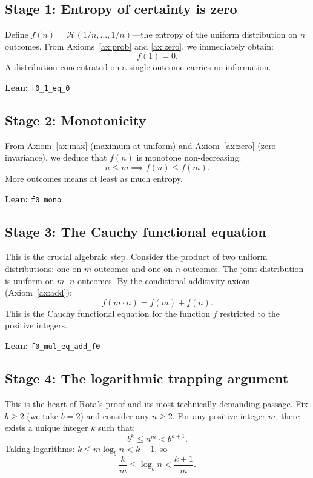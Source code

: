 \documentclass[12pt,a4paper]{article}
\theoremstyle{definition}
\newcommand{\lean}[1]{\texttt{#1}}
\newcommand{\Hfunc}{\mathcal{H}}
\begin{document}
\subsection{Stage 1: Entropy of certainty is zero}

Define $f(n) = \Hfunc(1/n, \dots, 1/n)$---the entropy of the uniform
distribution on $n$ outcomes.  From Axioms~\ref{ax:prob} and
\ref{ax:zero}, we immediately obtain:
\[
  f(1) = 0.
\]
A distribution concentrated on a single outcome carries no information.

\medskip\noindent
\textbf{Lean:} \lean{f0\_1\_eq\_0}

\subsection{Stage 2: Monotonicity}

From Axiom~\ref{ax:max} (maximum at uniform) and Axiom~\ref{ax:zero}
(zero invariance), we deduce that $f(n)$ is monotone non-decreasing:
\[
  n \leq m \implies f(n) \leq f(m).
\]
More outcomes means at least as much entropy.

\medskip\noindent
\textbf{Lean:} \lean{f0\_mono}

\subsection{Stage 3: The Cauchy functional equation}

This is the crucial algebraic step.  Consider the product of two
uniform distributions: one on $m$ outcomes and one on $n$ outcomes.  The
joint distribution is uniform on $m \cdot n$ outcomes.  By the
conditional additivity axiom (Axiom~\ref{ax:add}):
\[
  f(m \cdot n) = f(m) + f(n).
\]
This is the Cauchy functional equation for the function $f$ restricted
to the positive integers.

\medskip\noindent
\textbf{Lean:} \lean{f0\_mul\_eq\_add\_f0}

\subsection{Stage 4: The logarithmic trapping argument}

This is the heart of Rota's proof and its most technically demanding
passage.  Fix $b \geq 2$ (we take $b = 2$) and consider any $n \geq 2$.
For any positive integer $m$, there exists a unique integer $k$ such
that:
\[
  b^k \leq n^m < b^{k+1}.
\]
Taking logarithms: $k \leq m \log_b n < k + 1$, so
\[
  \frac{k}{m} \leq \log_b n < \frac{k+1}{m}.
\]
\end{document}
